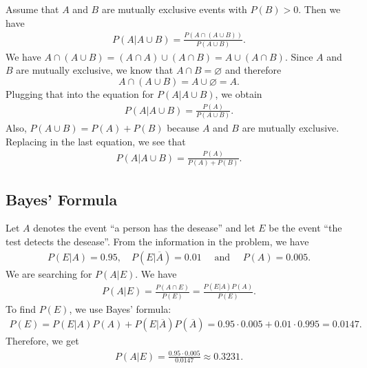 	\begin{problem}
	Assume that $A$ and $B$ are mutually exclusive events with $P (B) > 0$. Then we have
		\begin{align*}
		P (A | A \cup B) = \frac{P (A \cap (A \cup B))}{P (A \cup B)} .
		\end{align*}
	We have $A \cap (A \cup B) = (A \cap A) \cup (A \cap B) = A \cup (A \cap B )$. Since $A$ and $B$ are mutually exclusive, we know that $A \cap B = \varnothing$ and therefore 
		$$
		A \cap (A \cup B) = A \cup \varnothing = A.
		$$
	Plugging that into the equation for $P (A | A \cup B)$, we obtain
		\begin{align}
		P (A | A \cup B) = \frac{P (A)}{P (A \cup B)} .
		\end{align} 
	Also, $P (A \cup B) = P (A) + P (B)$ because $A$ and $B$ are mutually exclusive. Replacing in the last equation, we see that
		\begin{align*}
		P (A | A \cup B) = \frac{P (A)}{P (A ) + P (B)} . \tag*{$\triangle$}
		\end{align*}
	\end{problem}
	
	\subsection{Bayes' Formula}
	
	\begin{problem}
	Let $A$ denotes the event ``a person has the desease'' and let $E$ be the event ``the test detects the desease''. From the information in the problem, we have
		\begin{align*}
		P (E | A) = 0.95 , \quad P (E | \overline{A}) = 0.01 \quad \text{ and } \quad P (A ) = 0.005 .
		\end{align*}
	We are searching for $P (A|E)$. We have
		\begin{align*}
		P (A | E) = \frac{P (A \cap E )}{P (E)} = \frac{ P (E | A)P (A)}{P (E)} .
		\end{align*}
	To find $P (E)$, we use Bayes' formula:
		\begin{align*}
		P (E) = P (E |A) P (A) + P (E | \overline{A}) P (\overline{A}) = 0.95 \cdot 0.005 + 0.01 \cdot 0.995 = 0.0147 .
		\end{align*}
	Therefore, we get
		\begin{align*}
		P (A | E ) = \frac{ 0.95 \cdot 0.005}{0.0147} \approx 0.3231 . \tag*{$\triangle$}
		\end{align*}
	\end{problem}

